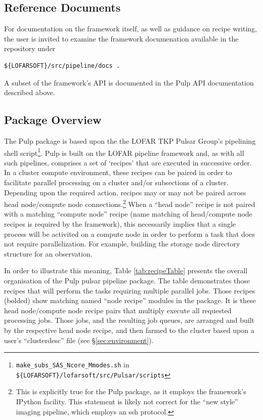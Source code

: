 \documentclass[a4paper,10pt,bibtotoc]{scrartcl}
\begin{document}
\subsection{Reference Documents}
For documentation on the framework itself, as well as guidance on recipe writing,
the user is invited to examine the framework documenation available in the 
repository under
\begin{verbatim}
${LOFARSOFT}/src/pipeline/docs .
\end{verbatim}
A subset of the framework's API is documented in the Pulp  API
documentation described above.

\subsection{Package Overview}
\label{sec:package}
The Pulp package is based upon the the LOFAR TKP Pulsar Group's pipelining shell 
script\footnote{ \texttt{make\_subs\_SAS\_Ncore\_Mmodes.sh} in
\texttt{ \$\{LOFARSOFT\}/lofarsoft/src/Pulsar/scripts}}.  Pulp is 
built on the LOFAR pipeline framework and, as with all such pipelines, 
comprises a set of `recipes' that are executed in successive order.  
In a cluster compute environment, these recipes can be paired in order 
to facilitate parallel processing on a cluster and/or subsections of a 
cluster. Depending upon the required action, recipes may or may not be 
paired across head node/compute node connections.\footnote{This is
  explicitly true for the Pulp package, as it employs the framework's IPython
  facility.  This statement is likely not correct for the ``new
  style'' imaging pipeline, which employs an ssh protocol.}  When a ``head node'' 
recipe is not paired with a matching ``compute node'' recipe (name
matching of head/compute node recipes is required by the framework),
this necessarily implies that a single process will be activited on a
compute node in order to perform a task that does not require
parallelization. For example, building the storage node directory
structure for an observation.

In order to illustrate this meaning, Table \ref{tab:recipeTable} presents 
the overall organisation of the Pulp pulsar pipeline package.  The table 
demonstrates those recipes that will perform the tasks requiring multiple 
parallel jobs.  Those recipes (bolded) show matching named ``node recipe'' 
modules in the package.  It is these head node/compute node recipe pairs that 
multiply execute all requested processing jobs.  Those jobs, and the resulting 
job queues, are arranged and built by the respective head node recipe, and 
then farmed to the cluster based upon a user's ``clusterdesc'' 
file (see \S \ref{sec:environment}).
\end{document}
